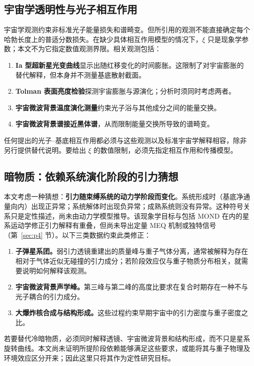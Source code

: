 \documentclass[UTF8,fontset=none,11pt,a4paper]{ctexart}
\begin{document}
\subsection{宇宙学透明性与光子相互作用}

宇宙学观测约束非标准光子能量损失和谱畸变。但所引用的观测不能直接确定每个哈勃长度上的普适分数损失。在缺少具体相互作用模型的情况下，$\xi$ 只是现象学参数；本文不为它指定数值观测界限。相关观测包括：
\begin{enumerate}
\item \textbf{Ia 型超新星光变曲线}显示出随红移变化的时间膨胀\cite{Goldhaber2001}。这限制了对宇宙膨胀的替代解释，但本身并不测量基底散射截面。
\item \textbf{Tolman 表面亮度检验}探测宇宙膨胀与源演化\cite{Lubin2001}；分析时须同时考虑两者。
\item \textbf{宇宙微波背景温度演化测量}约束光子浴与其他成分之间的能量交换。
\item \textbf{宇宙微波背景谱接近黑体谱}\cite{Fixsen1996}，从而限制能量交换所导致的谱畸变。
\end{enumerate}
任何提出的光子--基底相互作用都必须与这些观测以及标准宇宙学解释相容，除非另行提供替代说明。要给出 $\xi$ 的数值限制，必须先指定相互作用和传播模型。

\subsection{暗物质：依赖系统演化阶段的引力猜想}\label{sec:dm}

本文考虑一种猜想：\textbf{引力随束缚系统的动力学阶段而变化}。系统形成时（基底净通量向内）出现正异常；系统解体时出现负异常；成熟系统则没有异常。这种符号关系只是定性描述，尚未由动力学模型推导。该现象学目标与包括 MOND 在内的星系运动学修正引力解释有重叠\cite{McGaugh2016}，但尚未导出定量 MEQ 机制或独特信号（第~\ref{sec:p4} 节）。以下三类数据约束此类修正：
\begin{enumerate}
\item \textbf{子弹星系团。}弱引力透镜重建出的质量峰与重子气体分离\cite{Clowe2006}，通常被解释为存在相对于气体近似无碰撞的引力成分；若阶段效应仅与重子物质分布相关，就需要说明如何解释该观测。
\item \textbf{宇宙微波背景声学峰。}第三峰与第二峰的高度比要求在复合时期存在一种不与光子耦合的引力成分\cite{Planck2020}。
\item \textbf{大爆炸核合成与结构形成。}这些过程约束早期宇宙中的引力密度与重子密度之比。
\end{enumerate}
若要替代冷暗物质，必须同时解释透镜、宇宙微波背景和结构形成，而不只是星系旋转曲线。本文尚未证明所提阶段依赖能够满足这些要求，或能将其与重子物理及环境效应区分开来；因此这里只将其作为定性研究目标。
\end{document}
